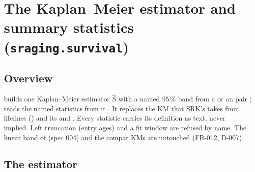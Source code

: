 \section{The Kaplan--Meier estimator and summary statistics (\texttt{sraging.survival})}\label{sec:surv}

\subsection{Overview}\label{sec:surv-overview}

 builds one Kaplan--Meier estimator $\hat S$ with a named 95\,\% band from a
 or an  pair ;  reads the named statistics
from it . It replaces the KM that SRK's  takes from lifelines
() and its  and . Every statistic carries its
definition as text, never implied. Left truncation (entry ages) and a fit window are refused by name. The linear
band of  (spec 004) and the compat KMs are untouched (FR-012, D-007).

\subsection{The estimator}\label{sec:surv-km}

